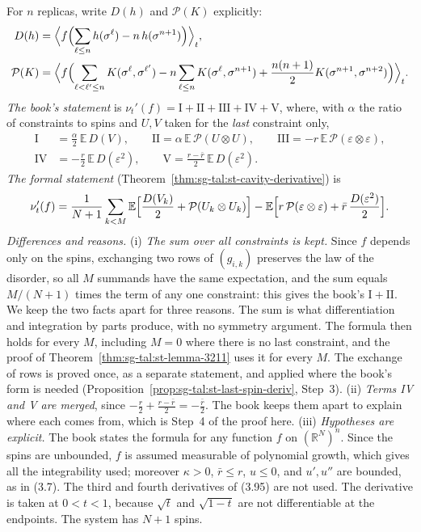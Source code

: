 \begin{remark}\label{rem:sg-tal:st-prop-321}
For $n$ replicas, write $D(h)$ and $\mathcal P(K)$ explicitly:
\begin{align*}
D(h)&=\Bigl\langle f\Bigl(\sum_{\ell\le n}h(\sigma^\ell)-n\,h(\sigma^{n+1})\Bigr)\Bigr\rangle_t,\\
\mathcal P(K)&=\Bigl\langle f\Bigl(\sum_{\ell<\ell'\le n}K(\sigma^\ell,\sigma^{\ell'})
-n\sum_{\ell\le n}K(\sigma^\ell,\sigma^{n+1})
+\frac{n(n+1)}2K(\sigma^{n+1},\sigma^{n+2})\Bigr)\Bigr\rangle_t .
\end{align*}
\emph{The book's statement} is $\nu_t'(f)=\mathrm I+\mathrm{II}+\mathrm{III}+\mathrm{IV}+\mathrm V$, where, with
$\alpha$ the ratio of constraints to spins and $U,V$ taken for the \emph{last} constraint only,
\begin{align*}
\mathrm I&=\frac\alpha2\,\mathbb E\,D(V),\qquad
\mathrm{II}=\alpha\,\mathbb E\,\mathcal P(U\otimes U),\qquad
\mathrm{III}=-r\,\mathbb E\,\mathcal P(\varepsilon\otimes\varepsilon),\\
\mathrm{IV}&=-\frac r2\,\mathbb E\,D(\varepsilon^2),\qquad
\mathrm V=\frac{r-\bar r}2\,\mathbb E\,D(\varepsilon^2).
\end{align*}
\emph{The formal statement} (Theorem~\ref{thm:sg-tal:st-cavity-derivative}) is
\[
\nu_t'(f)=\frac1{N+1}\sum_{k<M}\mathbb E\Bigl[\frac{D(V_k)}2+\mathcal P(U_k\otimes U_k)\Bigr]
-\mathbb E\Bigl[r\,\mathcal P(\varepsilon\otimes\varepsilon)+\bar r\,\frac{D(\varepsilon^2)}2\Bigr].
\]
\emph{Differences and reasons.}
(i) \emph{The sum over all constraints is kept.} Since $f$ depends only on the spins, exchanging two rows of
$(g_{i,k})$ preserves the law of the disorder, so all $M$ summands have the same expectation, and the sum equals
$M/(N+1)$ times the term of any one constraint: this gives the book's $\mathrm I+\mathrm{II}$. We keep the two
facts apart for three reasons. The sum is what differentiation and integration by parts produce, with no symmetry
argument. The formula then holds for every $M$, including $M=0$ where there is no last constraint, and the proof
of Theorem~\ref{thm:sg-tal:st-lemma-3211} uses it for every $M$. The exchange of rows is proved once, as a
separate statement, and applied where the book's form is needed
(Proposition~\ref{prop:sg-tal:st-last-spin-deriv}, Step~3).
(ii) \emph{Terms IV and V are merged}, since
$-\frac r2+\frac{r-\bar r}2=-\frac{\bar r}2$. The book keeps them apart to explain where each comes from, which is
Step~4 of the proof here.
(iii) \emph{Hypotheses are explicit.} The book states the formula for any function $f$ on $(\mathbb R^N)^n$.
Since the spins are unbounded, $f$ is assumed measurable of polynomial growth, which gives all the integrability
used; moreover $\kappa>0$, $\bar r\le r$, $u\le0$, and $u',u''$ are bounded, as in (3.7). The third and fourth
derivatives of (3.95) are not used. The derivative is taken at $0<t<1$, because $\sqrt t$ and $\sqrt{1-t}$ are
not differentiable at the endpoints. The system has $N+1$ spins.
\end{remark}

